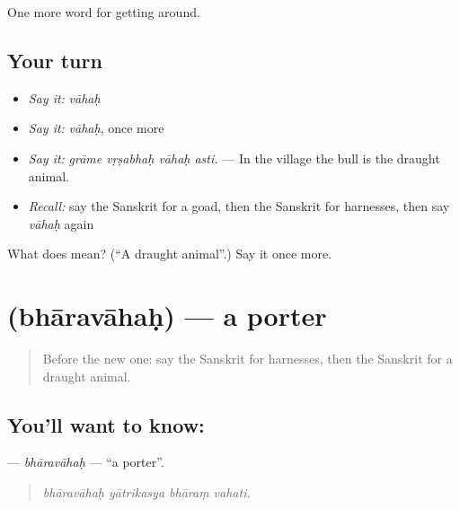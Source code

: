 \begin{grammarlens}[title={What you've built}]
One more word for getting around.
\end{grammarlens}

\subsection*{Your turn}
\begin{itemize}
\raggedright
  \item \emph{Say it:} \emph{vāhaḥ}
  \item \emph{Say it:} \emph{vāhaḥ}, once more
  \item \emph{Say it:} \emph{grāme vṛṣabhaḥ vāhaḥ asti.} — In the village the bull is the draught animal.
  \item \emph{Recall:} say the Sanskrit for a goad, then the Sanskrit for harnesses, then say \emph{vāhaḥ} again
\end{itemize}

\begin{tcolorbox}[breakable,colback=teal!4,colframe=teal!35!black,title={Before you move on}]
What does  mean? (\textquotedblleft{}A draught animal\textquotedblright{}.) Say it once more.
\end{tcolorbox}
\section[\texorpdfstring{\sk{भारवाहः} (bhāravāhaḥ)}{भारवाहः (bhāravāhaḥ)}]{ (bhāravāhaḥ) — a porter}

\label{lesson:SA-C408-bharavahah}



\begin{quote}
Before the new one: say the Sanskrit for harnesses, then the Sanskrit for a draught animal.
\end{quote}

\subsection*{You'll want to know: }
\textbf{} — \emph{bhāravāhaḥ} — \textquotedblleft{}a porter\textquotedblright{}.

\begin{quote}
   
\end{quote}

\begin{quote}
\emph{bhāravāhaḥ yātrikasya bhāraṃ vahati.}
\end{quote}

